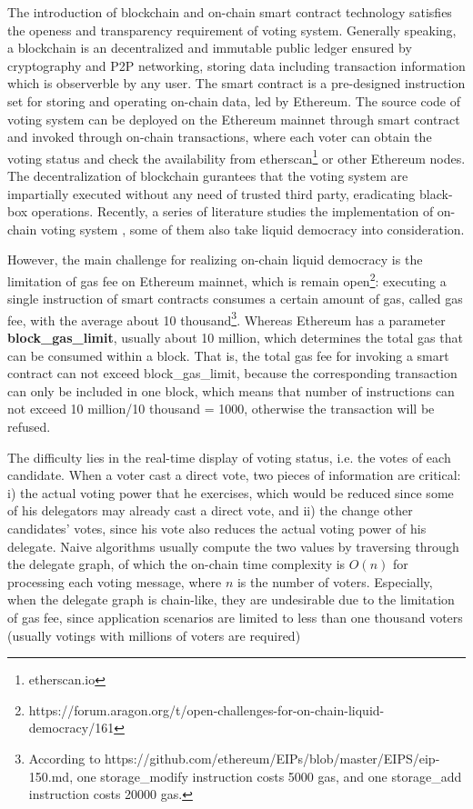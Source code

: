 The introduction of blockchain \cite{nakamoto2008bitcoin} and on-chain smart contract technology \cite{wood2014ethereum} satisfies the openess and transparency requirement of voting system. Generally speaking, a blockchain is an decentralized and immutable public ledger ensured by cryptography and P2P networking, storing data including transaction information which is observerble by any user. The smart contract is a pre-designed instruction set for storing and operating on-chain data, led by Ethereum. The source code of voting system can be deployed on the Ethereum mainnet through smart contract and invoked through on-chain transactions, where each voter can obtain the voting status and check the availability from etherscan\footnote{etherscan.io} or other Ethereum nodes. The decentralization of blockchain gurantees that the voting system are impartially executed without any need of trusted third party, eradicating black-box operations. Recently, a series of literature studies the implementation of on-chain voting system \cite{hanifatunnisa2017blockchain,hjalmarsson2018blockchain}, some of them also take liquid democracy into consideration. 

However, the main challenge for realizing on-chain liquid democracy is the limitation of gas fee on Ethereum mainnet, which is remain open\footnote{https://forum.aragon.org/t/open-challenges-for-on-chain-liquid-democracy/161}: executing a single instruction of smart contracts consumes a certain amount of gas, called gas fee, with the average about 10 thousand\footnote{According to https://github.com/ethereum/EIPs/blob/master/EIPS/eip-150.md, one storage\_modify instruction costs 5000 gas, and one storage\_add instruction costs 20000 gas.}.  Whereas Ethereum has a parameter \textbf{block\_gas\_limit}, usually about 10 million, which determines the total gas that can be consumed within a block. That is, the total gas fee for invoking a smart contract can not exceed block\_gas\_limit, because the corresponding transaction can only be included in one block, which means that number of instructions can not exceed 10 million/10 thousand = 1000, otherwise the transaction will be refused. 

The difficulty lies in the real-time display of voting status, i.e. the votes of each candidate. When a voter cast a direct vote, two pieces of information are critical: i) the actual voting power that he exercises, which would be reduced since some of his delegators may already cast a direct vote, and ii) the change other candidates' votes, since his vote also reduces the actual voting power of his delegate. Naive algorithms  usually compute the two values by traversing through the delegate graph, of which the on-chain time complexity is $O(n)$ for processing each voting message, where $n$ is the number of voters. Especially, when the delegate graph is chain-like, they are undesirable due to the limitation of gas fee, since  application scenarios are limited to less than one thousand voters (usually votings with millions of voters are required)

